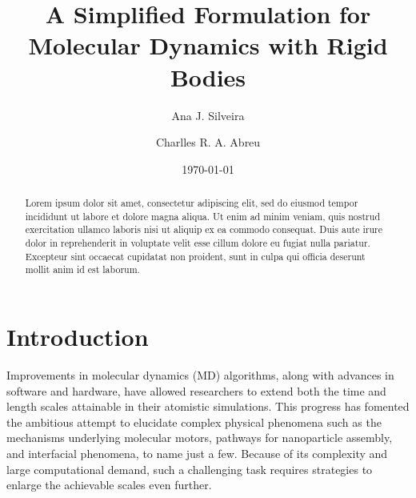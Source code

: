 \documentclass[aip,jcp,reprint,amsmath,amssymb,amsfont]{revtex4-1}
\begin{document}
\title{A Simplified Formulation for Molecular Dynamics with Rigid Bodies}

\author{Ana J. Silveira}

\author{Charlles R. A. Abreu}

\date{\today}

\begin{abstract}
Lorem ipsum dolor sit amet, consectetur adipiscing elit, sed do eiusmod tempor incididunt ut labore et dolore magna aliqua. Ut enim ad minim veniam, quis nostrud exercitation ullamco laboris nisi ut aliquip ex ea commodo consequat. Duis aute irure dolor in reprehenderit in voluptate velit esse cillum dolore eu fugiat nulla pariatur. Excepteur sint occaecat cupidatat non proident, sunt in culpa qui officia deserunt mollit anim id est laborum.
\end{abstract}

\maketitle

\section{Introduction}

Improvements in molecular dynamics (MD) algorithms, along with advances in software and hardware, have allowed researchers to extend both the time and length scales attainable in their atomistic simulations. This progress has fomented the ambitious attempt to elucidate complex physical phenomena such as the mechanisms underlying molecular motors, pathways for nanoparticle assembly, and interfacial phenomena, to name just a few. Because of its complexity and large computational demand, such a challenging task requires strategies to enlarge the achievable scales even further.
\end{document}
